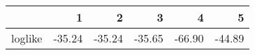 \begin{table}[ht]
\centering
\begin{tabular}{rrrrrr}
  \hline
 & 1 & 2 & 3 & 4 & 5 \\ 
  \hline
loglike & -35.24 & -35.24 & -35.65 & -66.90 & -44.89 \\ 
   \hline
\end{tabular}
\caption{} 
\label{fig Cryotherapy-5CV}
\end{table}
